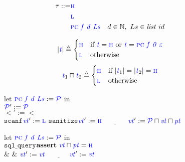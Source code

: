 \documentclass{llncs}
\begin{document}
{\begin{figure}

  \begin{minipage}{0.3\textwidth}
    \color{blue}
    \begin{align*}
      \tau ::= & \high \\
      & \low \\
      & \pctaint{f}{d}{Ls} & d \in \mathbb{N}, ~ Ls \in \mathit{list} ~ id \\
    \end{align*}
  \end{minipage}
  \begin{minipage}{0.69\textwidth}
    \[|\gentag| \triangleq
    \begin{cases}
      \high & \textnormal{if } \gentag = \high \textnormal{ or } \gentag = \pctaint{f}{0}{\varepsilon} \\
      \low & \textnormal{otherwise} \\
    \end{cases}\]
    \[\gentag_1 \sqcap \gentag_2 \triangleq
    \begin{cases}
      \high & \textnormal{if } |\gentag_1| = |\gentag_2| = \high \\
      \low & \textnormal{otherwise} \\
    \end{cases}\]
  \end{minipage}

  \begin{minipage}{0.54\textwidth}
    \storetruleblock
        {let \(\pctaint{f}{d}{Ls} := \PCT\) in \\
          \(\PCT' := \PCT\) \\
          \(\lt' := \lt\) \\
                      {\(\mathtt{scanf}\)}{\(\vt':=\low\)}
                      {\(\mathtt{sanitize}\)}{\(\vt':=\high\)}
                      {\(\underline{\hspace{3em}}\)}
                      {\(\vt' := \PCT \sqcap \vt \sqcap \pt\)}}
  \end{minipage}
  \begin{minipage}{0.45\textwidth}
    \loadtruleblock
        {let \(\pctaint{f}{d}{Ls} := \PCT\) in \\
                    {\(\mathtt{sql\_query}\)}{\(\mathbf{assert} ~ \vt \sqcap \pt = \high\) \\ & & \(\vt' := \vt\)}
                    {\(\underline{\hspace{3em}}\)}{\(\vt' := \vt\)}}


\end{minipage}
\end{figure}}
\end{document}
